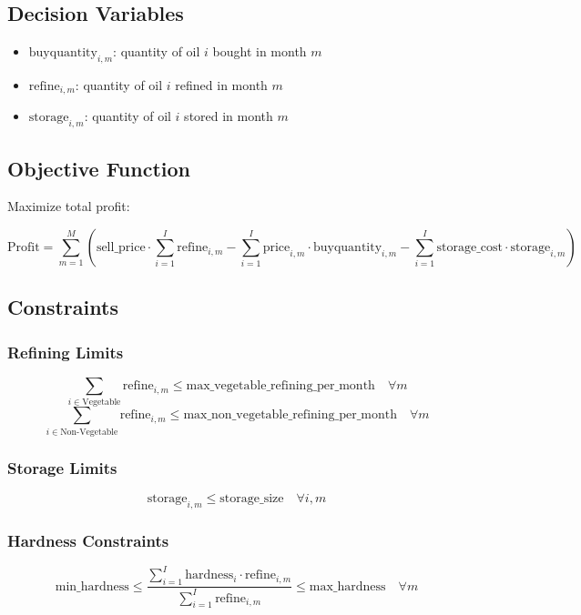 \documentclass{article}
\begin{document}
\subsection*{Decision Variables}
\begin{itemize}
    \item \( \text{buyquantity}_{i,m} \): quantity of oil \( i \) bought in month \( m \)
    \item \( \text{refine}_{i,m} \): quantity of oil \( i \) refined in month \( m \)
    \item \( \text{storage}_{i,m} \): quantity of oil \( i \) stored in month \( m \)
\end{itemize}

\subsection*{Objective Function}
Maximize total profit:

\[
\text{Profit} = \sum_{m=1}^{M} \left( \text{sell\_price} \cdot \sum_{i=1}^{I} \text{refine}_{i,m} - \sum_{i=1}^{I} \text{price}_{i,m} \cdot \text{buyquantity}_{i,m} - \sum_{i=1}^{I} \text{storage\_cost} \cdot \text{storage}_{i,m} \right)
\]

\subsection*{Constraints}

\subsubsection*{Refining Limits}
\[
\sum_{i \in \text{Vegetable}} \text{refine}_{i,m} \leq \text{max\_vegetable\_refining\_per\_month} \quad \forall m
\]
\[
\sum_{i \in \text{Non-Vegetable}} \text{refine}_{i,m} \leq \text{max\_non\_vegetable\_refining\_per\_month} \quad \forall m
\]

\subsubsection*{Storage Limits}
\[
\text{storage}_{i,m} \leq \text{storage\_size} \quad \forall i, m
\]

\subsubsection*{Hardness Constraints}
\[
\text{min\_hardness} \leq \frac{\sum_{i=1}^{I} \text{hardness}_{i} \cdot \text{refine}_{i,m}}{\sum_{i=1}^{I} \text{refine}_{i,m}} \leq \text{max\_hardness} \quad \forall m
\]
\end{document}
